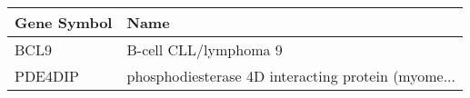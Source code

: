 \begin{tabular}{ll}
\toprule
Gene Symbol &                                               Name \\
\midrule
       BCL9 &                              B-cell CLL/lymphoma 9 \\
    PDE4DIP & phosphodiesterase 4D interacting protein (myome... \\
\bottomrule
\end{tabular}
